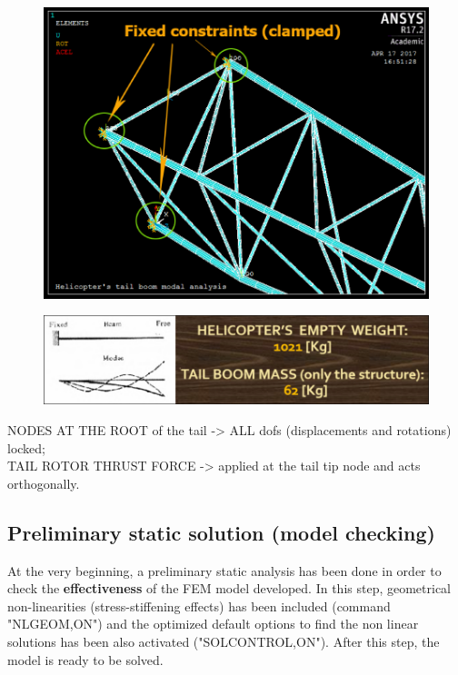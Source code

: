 \smallskip
\begin{figure}[h!]
	\begin{center}
		\centering  		 		
		\includegraphics[width=0.8\linewidth]{PICTURES/2_Lama_truss/PNG/BC.png}
	\end{center}
\end{figure}	

\smallskip
\begin{figure}[h!]
	\begin{center}
		\centering  		 		
		\includegraphics[width=1\linewidth]{PICTURES/2_Lama_truss/PNG/BC1.png}
	\end{center}
\end{figure}	

\noindent
NODES AT THE ROOT of the tail -> ALL dofs (displacements and rotations) locked; \\
TAIL ROTOR THRUST FORCE -> applied at the tail tip node and acts orthogonally.


\clearpage
\subsection*{Preliminary static solution (model checking)}
\noindent
At the very beginning, a preliminary static analysis has been done in order to check the \textbf{effectiveness} of the FEM model developed. 
In this step, geometrical non-linearities (stress-stiffening effects) has been included (command "NLGEOM,ON") and the optimized default options to find the non linear solutions has been also activated ("SOLCONTROL,ON"). After this step, the model is ready to be solved.

